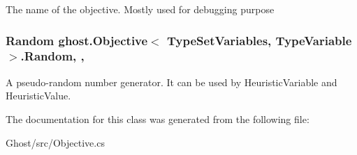 The name of the objective. Mostly used for debugging purpose \hypertarget{classghost_1_1Objective_3_01TypeSetVariables_00_01TypeVariable_01_4_ad1ab2a8ba444cebdf8a9e7ee692731b4}{
\subsubsection[{Random}]{\setlength{\rightskip}{0pt plus 5cm}Random ghost.\-Objective$<$ Type\-Set\-Variables, Type\-Variable $>$.Random\hspace{0.3cm}{\ttfamily [get]}, {\ttfamily [set]}, {\ttfamily [protected]}}}\label{classghost_1_1Objective_3_01TypeSetVariables_00_01TypeVariable_01_4_ad1ab2a8ba444cebdf8a9e7ee692731b4}
A pseudo-\/random number generator. It can be used by Heuristic\-Variable and Heuristic\-Value. 

The documentation for this class was generated from the following file\-:\begin{DoxyCompactItemize}
\item 
Ghost/src/Objective.\-cs\end{DoxyCompactItemize}

